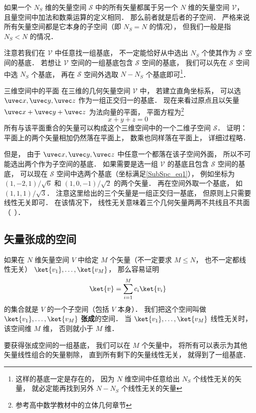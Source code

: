 

如果一个 $N_S$ 维的矢量空间 $\mathcal S$ 中的所有矢量都属于另一个 $N$ 维的矢量空间 $\mathcal V$， 且量空间中加法和数乘运算的定义相同． 那么前者就是后者的子空间． 严格来说所有矢量空间都是它本身的子空间（即 $N_S = N$ 的情况）， 但我们一般是指 $N_S < N$ 的情况．

注意若我们在 $\mathcal V$ 中任意找一组基底， 不一定能恰好从中选出 $N_S$ 个使其作为 $\mathcal S$ 空间的基底． 若想让 $\mathcal V$ 空间的一组基底包含 $\mathcal S$ 空间的基底， 我们可以先在 $\mathcal S$ 空间中选 $N_S$ 个基底， 再在 $\mathcal S$ 空间外选取 $N - N_S$ 个基底即可\footnote{这样的基底一定是存在的， 因为 $N$ 维空间中任意给出 $N_S$ 个线性无关的矢量， 就必定能再找到另外 $N - N_S$ 个线性无关的矢量}．

\begin{example}{三维空间中的平面}
在三维的几何矢量空间 $\mathcal V$ 中， 若建立直角坐标系， 可以选 $\uvec x, \uvec y, \uvec z$ 作为一组正交归一的基底． 现在来看过原点且以矢量 $\uvec x + \uvec y + \uvec z$ 为法向量的平面， 平面方程为\footnote{参考高中数学教材中的立体几何章节}
\begin{equation}\label{SubSpc_eq1}
x + y + z = 0
\end{equation}
所有与该平面重合的矢量可以构成这个三维空间中的一个二维子空间 $\mathcal S$． 证明： 平面上的两个矢量相加仍然落在平面上， 数乘也同样落在平面上， 详细过程略． 

但是， 由于 $\uvec x, \uvec y, \uvec z$ 中任意一个都落在该子空间外面， 所以不可能选出两个作为子空间的基底． 如果需要是选一组 $\mathcal V$ 的基底且包含 $\mathcal S$ 空间的基底， 可以现在 $\mathcal S$ 空间中选两个基底（坐标满足\autoref{SubSpc_eq1}）， 例如坐标为 $(1, -2, 1)/\sqrt{6}$ 和 $(1, 0, -1)/\sqrt{2}$ 的两个矢量． 再在空间外取一个基底， 如 $(1, 1, 1)/\sqrt{3}$． 注意这里给出的三个矢量是一组正交归一基底， 但原则上只需要线性无关即可． 在该情况下， 线性无关意味着三个几何矢量两两不共线且不共面（\label{linDpe_ex1}~）．
\end{example}

\subsection{矢量张成的空间}
如果在 $N$ 维矢量空间 $V$ 中给定 $M$ 个矢量（不一定要求 $M \leqslant N$， 也不一定都线性无关） $\ket{v_1}, \dots, \ket{v_M}$， 那么容易证明
\begin{equation}
\ket{v} = \sum_{i=1}^M c_i \ket{v_i}
\end{equation}
的集合就是 $V$ 的一个子空间（包括 $V$ 本身）． 我们把这个空间叫做 $\ket{v_1}, \dots, \ket{v_M}$ \textbf{张成}的空间． 当 $\ket{v_1}, \dots, \ket{v_M}$ 线性无关时， 该空间维 $M$ 维， 否则就小于 $M$ 维．

要获得张成空间的一组基底， 我们可以在 $M$ 个矢量中， 将所有可以表示为其他矢量线性组合的矢量剔除， 直到所有剩下的矢量线性无关， 就得到了一组基底．
